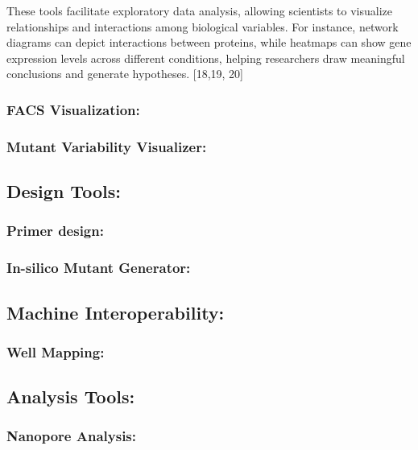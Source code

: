 \documentclass[
  letterpaper,
]{book}
\begin{document}
These tools facilitate exploratory data analysis, allowing scientists to
visualize relationships and interactions among biological variables. For
instance, network diagrams can depict interactions between proteins,
while heatmaps can show gene expression levels across different
conditions, helping researchers draw meaningful conclusions and generate
hypotheses. {[}18,19, 20{]}

\subsubsection{FACS Visualization:}\label{facs-visualization}

\subsubsection{Mutant Variability
Visualizer:}\label{mutant-variability-visualizer}

\subsection{Design Tools:}\label{design-tools}

\subsubsection{Primer design:}\label{primer-design}

\subsubsection{In-silico Mutant
Generator:}\label{in-silico-mutant-generator}

\subsection{Machine Interoperability:}\label{machine-interoperability}

\subsubsection{Well Mapping:}\label{well-mapping}

\subsection{Analysis Tools:}\label{analysis-tools}

\subsubsection{Nanopore Analysis:}\label{nanopore-analysis}
\end{document}
